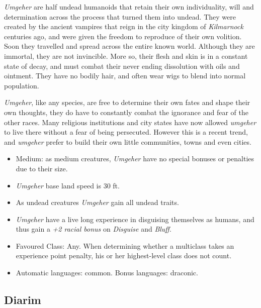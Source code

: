 

\emph{Umgeher} are half undead humanoids that retain their own individuality,
will and determination across the process that turned them into undead. They
were created by the ancient vampires that reign in the city kingdom of
\emph{Kilmarnock} centuries ago, and were given the freedom to reproduce of
their own volition. Soon they travelled and spread across the entire known
world. Although they are immortal, they are not invincible. More so, their
flesh and skin is in a constant state of decay, and must combat their never
ending dissolution with oils and ointment. They have no bodily hair, and often
wear wigs to blend into normal population.

\emph{Umgeher}, like any species, are free to determine their own fates and
shape their own thoughts, they do have to constantly combat the ignorance and
fear of the other races. Many religious institutions and city states have now
allowed \emph{umgeher} to live there without a fear of being
persecuted. However this is a recent trend, and \emph{umgeher} prefer to build
their own little communities, towns and even cities.

\begin{35e}
  \begin{itemize}[noitemsep]
    \item Medium: as medium creatures, \emph{Umgeher} have no special bonuses or
    penalties due to their size.
    \item \emph{Umgeher} base land speed is 30 ft.
    \item As undead creatures \emph{Umgeher} gain all undead traits.
    \item \emph{Umgeher} have a live long experience in disguising themselves as
    humans, and thus gain a \emph{+2 racial bonus} on \emph{Disguise} and
    \emph{Bluff}.
    \item Favoured Class: Any. When determining whether a multiclass takes an
    experience point penalty, his or her highest-level class does not count.
    \item Automatic languages: common. Bonus languages: draconic.
  \end{itemize}
\end{35e}

\subsection*{Diarim}


